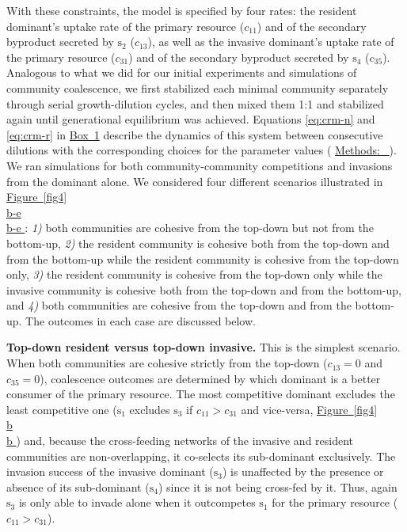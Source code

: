 \documentclass[a4paper,10pt]{article}
\newcommand{\figref}[2][]{%
  \hyperref[{#2}]{%
    Figure~\ref*{#2}%
    \ifx\\#1\\%
    \else
      #1%
    \fi
  }%
}
\newcommand{\methodsref}[1]{%
  \hyperref[{methods:#1}]{%
   Methods:~\nameref*{methods:#1}%
  }%
}
\begin{document}
With these constraints, the model is specified by four rates:
the resident dominant's uptake rate of the primary resource ($c_{11}$)
and of the secondary byproduct secreted by $\mathrm{s}_2$ ($c_{13}$),
as well as
the invasive dominant's uptake rate of the primary resource ($c_{31}$)
and of the secondary byproduct secreted by $\mathrm{s}_4$ ($c_{35}$).
Analogous to what we did for our initial
experiments and simulations of community coalescence,
we first stabilized each minimal community separately
through serial growth-dilution cycles,
and then mixed them 1:1 and stabilized again until generational
equilibrium was achieved.
Equations \ref{eq:crm-n} and \ref{eq:crm-r} in \hyperref[box1]{Box~1}
describe the dynamics of this system between consecutive dilutions
with the corresponding choices for the parameter values
(\methodsref{sim-min}).
We ran simulations for both community-community competitions and
invasions from the dominant alone.
We considered four different scenarios illustrated in \figref[b-e]{fig4}:
\textit{1)} both communities are cohesive
from the top-down but not from the bottom-up,
\textit{2)} the resident community is cohesive
both from the top-down and from the bottom-up
while
the resident community is cohesive
from the top-down only,
\textit{3)} the resident community is cohesive
from the top-down only
while
the invasive community is cohesive
both from the top-down and from the bottom-up,
and \textit{4)} both communities are cohesive
from the top-down and from the bottom-up.
The outcomes in each case are discussed below.

\textbf{Top-down resident versus top-down invasive.}
This is the simplest scenario.
When both communities are cohesive strictly from the top-down
($c_{13}=0$ and $c_{35}=0$),
coalescence outcomes are determined by which dominant is a better consumer
of the primary resource.
The most competitive dominant excludes the least competitive one
($\mathrm{s}_1$ excludes $\mathrm{s}_3$ if $c_{11}>c_{31}$ and vice-versa,
\figref[b]{fig4})
and,
because the cross-feeding networks of the invasive and resident
communities are non-overlapping,
it co-selects its sub-dominant exclusively.
The invasion success of the invasive dominant ($\mathrm{s}_3$) is
unaffected by the presence or absence of its sub-dominant ($\mathrm{s}_4$)
since it is not being cross-fed by it.
Thus, again $\mathrm{s}_3$ is only able to invade alone when it
outcompetes $\mathrm{s}_1$ for the primary resource ($c_{11}>c_{31}$).
\end{document}
